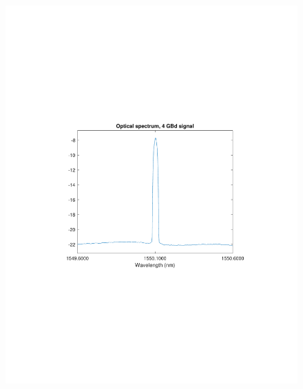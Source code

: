 \begin{refsection}
\begin{figure}[H]
	\centering
	\begin{minipage}{0.43\textwidth}
		\centering
		\includegraphics[clip, trim=4cm 8cm 4cm 8cm, width=1\textwidth]{./sdf/m_qam_system/figures/expResults/homodyne/4GBdOSASpectrum.pdf}
		\label{fig:4GBdOptiSpectHm}
	\end{minipage}
	\begin{minipage}{0.43\textwidth}
		\centering

\end{minipage}
\end{figure}
\end{refsection}
